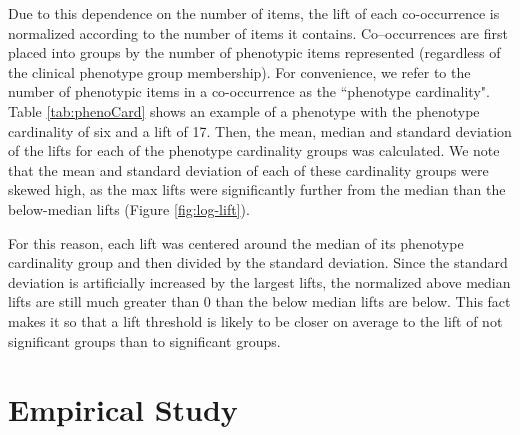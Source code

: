 \documentclass{sig-alternate-05-2015}
\newcommand{\kibitz}[2]{\ifnum\Comments=1\textcolor{#1}{#2}\fi}
\newcommand{\jette}[1]{\kibitz{red}      {[Jette: #1]}}
\begin{document}
Due to this dependence on the number of items, the lift of each co-occurrence is normalized according to the number of items it contains.
Co--occurrences are first placed into groups by the number of phenotypic items represented (regardless of the clinical phenotype group membership).
For convenience, we refer to the number of phenotypic items in a co-occurrence as the ``phenotype cardinality".
Table \ref {tab:phenoCard} shows an example of a phenotype with the phenotype cardinality of six and a lift of 17.
Then, the mean, median and standard deviation of the lifts for each of the phenotype cardinality groups was calculated.
We note that the mean and standard deviation of each of these cardinality groups were skewed high, as the max lifts were significantly further from the median than the below-median lifts (Figure \ref{fig:log-lift}).

For this reason, each lift was centered around the median of its phenotype cardinality group and then divided by the standard deviation.
Since the standard deviation is artificially increased by the largest lifts, the normalized above median lifts are still much greater than 0 than the below median lifts are below. This fact makes it so that a lift threshold is likely to be closer on average to the lift of not significant groups than to significant groups.%


\section{Empirical Study}
\end{document}
